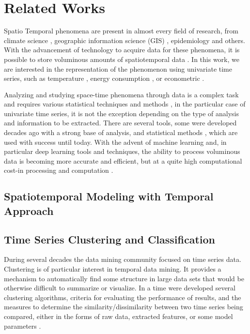 \chapter{Related Works}
\label{chapter_Related_Works}


Spatio Temporal phenomena are present in almost every field of research, from climate science \cite{}, geographic information science (GIS) \cite{}, epidemiology \cite{} and others. With the advancement of technology to acquire data for these phenomena, it is possible to store voluminous amounts of spatiotemporal data \cite{Atluri2018}. In this work, we are interested in the representation of the phenomenon using univariate time series, such as temperature \cite{}, energy consumption \cite{}, or econometric \cite{Moral2003}.

Analyzing and studying space-time phenomena through data is a complex task and requires various statistical techniques and methods \cite{Rao2008}, in the particular case of univariate time series, it is not the exception depending on the type of analysis and information to be extracted. There are several tools, some were developed decades ago with a strong base of analysis, and statistical methods \cite{}, which are used with success until today. With the advent of machine learning and, in particular deep learning tools and techniques, the ability to process voluminous data is becoming more accurate and efficient, but at a quite high computational cost-in processing and computation \cite{}.

\section{Spatiotemporal Modeling with Temporal Approach}
\label{Sec:SPT-Temporal}


\section{Time Series Clustering and Classification}
\label{Sec:ClusteringRelatedWorks}

During several decades the data mining community focused on time series data. Clustering is of particular interest in temporal data mining. It provides a mechanism to automatically find some structure in large data sets that would be otherwise difficult to summarize or visualize. In a time were developed several clustering algorithms, criteria for evaluating the performance of results, and the measures to determine the similarity/dissimilarity between two time series being compared, either in the forms of raw data, extracted features, or some model parameters \cite{Liao2005, Aghabozorgi2015}.

